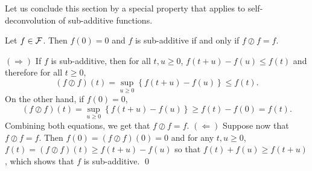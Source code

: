 Let us conclude this section by a special property that applies to self-deconvolution of sub-additive functions.
\begin{theorem}
Let $f \in \mathcal F$. Then $f(0) = 0$ and $f$ is sub-additive if and only if $f \oslash f = f$.
\end{theorem}
\pr $(\Rightarrow)$ If $f$ is sub-additive, then for all $t,u \geq 0$, $f(t+u) - f(u) \leq f(t)$ and therefore for all $t \geq 0$,
$$ (f \oslash f)(t) = \sup_{u \geq 0} \left\{ f(t+u) - f(u) \right\} \leq f(t) .$$
On the other hand, if $f(0) = 0$,
$$ (f \oslash f)(t) = \sup_{u \geq 0} \left\{ f(t+u) - f(u) \right\} \geq f(t) - f(0) = f(t). $$
Combining both equations, we get that $ f \oslash f = f$.
$(\Leftarrow )$ Suppose now that $ f \oslash f = f$. Then $f(0) = (f \oslash f)(0) = 0$ and
for any $t, u \geq 0$, $f(t) = (f \oslash f)(t) \geq f(t+u) - f(u)$ so that $f(t) + f(u) \geq f(t+u)$, which shows that
$f$  is sub-additive.
\qed
